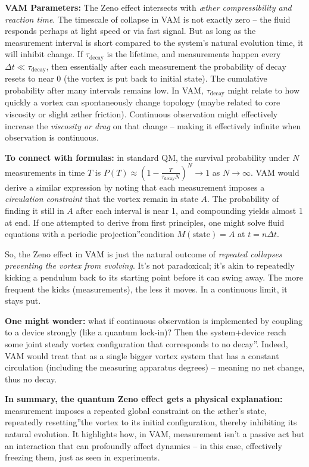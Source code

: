 \documentclass[a4paper, aps,preprint,superscriptaddress, 12pt]{revtex4}
\begin{document}
\textbf{VAM Parameters:} The Zeno effect intersects with \textit{æther compressibility and reaction time}. The timescale of collapse in VAM is not exactly zero – the fluid responds perhaps at light speed or via fast signal. But as long as the measurement interval is short compared to the system's natural evolution time, it will inhibit change. If $\tau_{\text{decay}}$ is the lifetime, and measurements happen every $\Delta t \ll \tau_{\text{decay}}$, then essentially after each measurement the probability of decay resets to near 0 (the vortex is put back to initial state). The cumulative probability after many intervals remains low. In VAM, $\tau_{\text{decay}}$ might relate to how quickly a vortex can spontaneously change topology (maybe related to core viscosity or slight æther friction). Continuous observation might effectively increase the \textit{viscosity or drag} on that change – making it effectively infinite when observation is continuous.


\textbf{To connect with formulas:} in standard QM, the survival probability under $N$ measurements in time $T$ is $P(T) \approx \left(1 - \frac{T}{\tau_{\text{decay}} N}\right)^N \to 1$ as $N\to\infty$. VAM would derive a similar expression by noting that each measurement imposes a \textit{circulation constraint} that the vortex remain in state $A$. The probability of finding it still in $A$ after each interval is near 1, and compounding yields almost 1 at end. If one attempted to derive from first principles, one might solve fluid equations with a periodic \grqq projection\textquotedblright condition $M(\text{state})=A$ at $t = n\Delta t$.


So, the Zeno effect in VAM is just the natural outcome of \textit{repeated collapses preventing the vortex from evolving}. It's not paradoxical; it's akin to repeatedly kicking a pendulum back to its starting point before it can swing away. The more frequent the kicks (measurements), the less it moves. In a continuous limit, it stays put.


\textbf{One might wonder:} what if continuous observation is implemented by coupling to a device strongly (like a quantum lock-in)? Then the system+device reach some joint steady vortex configuration that corresponds to \grqq no decay\textquotedblright. Indeed, VAM would treat that as a single bigger vortex system that has a constant circulation (including the measuring apparatus degrees) – meaning no net change, thus no decay.


\textbf{In summary, the quantum Zeno effect gets a physical explanation:} measurement imposes a repeated global constraint on the æther's state, repeatedly \grqq resetting\textquotedblright the vortex to its initial configuration, thereby inhibiting its natural evolution. It highlights how, in VAM, measurement isn't a passive act but an interaction that can profoundly affect dynamics – in this case, effectively freezing them, just as seen in experiments.
\end{document}
